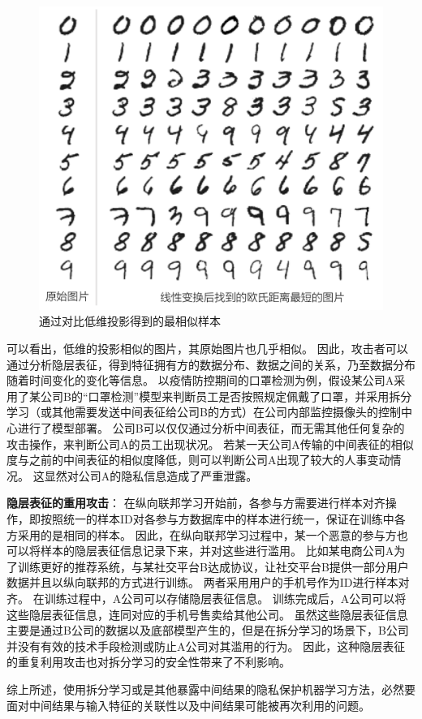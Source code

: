%
\begin{figure}[h!]
    \centering
    \includegraphics[width=0.66\linewidth]{Z_Resources/ss-perm_mnist-knn}
    \caption{通过对比低维投影得到的最相似样本}
    \label{fig:ss-perm:mnist-knn}
\end{figure}
%
可以看出，低维的投影相似的图片，其原始图片也几乎相似。
%
因此，攻击者可以通过分析隐层表征，得到特征拥有方的数据分布、数据之间的关系，乃至数据分布随着时间变化的变化等信息。
%
以疫情防控期间的口罩检测为例，假设某公司A采用了某公司B的“口罩检测”模型来判断员工是否按照规定佩戴了口罩，并采用拆分学习（或其他需要发送中间表征给公司B的方式）在公司内部监控摄像头的控制中心进行了模型部署。
%
公司B可以仅仅通过分析中间表征，而无需其他任何复杂的攻击操作，来判断公司A的员工出现状况。
若某一天公司A传输的中间表征的相似度与之前的中间表征的相似度降低，则可以判断公司A出现了较大的人事变动情况。
%
这显然对公司A的隐私信息造成了严重泄露。


\textbf{隐层表征的重用攻击}：
在纵向联邦学习开始前，各参与方需要进行样本对齐操作，即按照统一的样本ID对各参与方数据库中的样本进行统一，保证在训练中各方采用的是相同的样本。
%
因此，在纵向联邦学习过程中，某一个恶意的参与方也可以将样本的隐层表征信息记录下来，并对这些进行滥用。
%
比如某电商公司A为了训练更好的推荐系统，与某社交平台B达成协议，让社交平台B提供一部分用户数据并且以纵向联邦的方式进行训练。
两者采用用户的手机号作为ID进行样本对齐。
%
在训练过程中，A公司可以存储隐层表征信息。
%
训练完成后，A公司可以将这些隐层表征信息，连同对应的手机号售卖给其他公司。
%
虽然这些隐层表征信息主要是通过B公司的数据以及底部模型产生的，但是在拆分学习的场景下，B公司并没有有效的技术手段检测或防止A公司对其滥用的行为。
%
因此，这种隐层表征的重复利用攻击也对拆分学习的安全性带来了不利影响。

综上所述，使用拆分学习或是其他暴露中间结果的隐私保护机器学习方法，必然要面对中间结果与输入特征的关联性以及中间结果可能被再次利用的问题。


